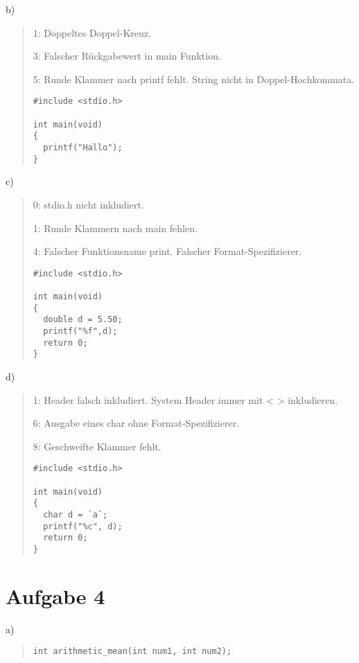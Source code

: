 \documentclass[10pt, a4paper]{article}
\begin{document}
b)
\begin{quote}
1: Doppeltes Doppel-Kreuz.

3: Falscher Rückgabewert in main Funktion.

5: Runde Klammer nach printf fehlt. String nicht in Doppel-Hochkommata.


\begin{lstlisting}
#include <stdio.h>

int main(void)
{
  printf("Hallo");
}
\end{lstlisting}
\end{quote}
c)
\begin{quote}
0: stdio.h nicht inkludiert.

1: Runde Klammern nach main fehlen.

4: Falscher Funktionsname print. Falscher Format-Spezifizierer.


\begin{lstlisting}
#include <stdio.h>

int main(void)
{
  double d = 5.50;
  printf("%f",d);
  return 0;
}
\end{lstlisting}
\end{quote}
d)
\begin{quote}
1: Header falsch inkludiert. System Header immer mit < > inkludieren.

6: Ausgabe eines char ohne Format-Spezifizierer.

8: Geschweifte Klammer fehlt.


\begin{lstlisting}
#include <stdio.h>

int main(void)
{
  char d = `a`;
  printf("%c", d);
  return 0;
}
\end{lstlisting}
\end{quote}

\section{Aufgabe 4} 
 \label{sec:aufgabe-4}

a)
\begin{quote} 
\begin{lstlisting} 
int arithmetic_mean(int num1, int num2);
\end{lstlisting}
\end{quote}
\end{document}
